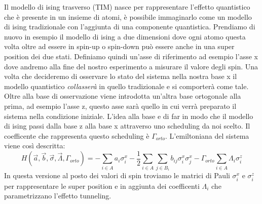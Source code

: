 Il modello di ising trasverso (TIM) nasce per rappresentare l'effetto quantistico che è presente in un insieme di atomi, è possibile immaginarlo come un modello di ising tradizionale con l'aggiunta di una componente quantistica. Prendiamo di nuovo in esempio il modello di ising a due dimensioni dove ogni atomo questa volta oltre ad essere in spin-up o spin-down può essere anche in una super position dei due stati. Definiamo quindi un'asse di riferimento ad esempio l'asse x dove andremo alla fine del nostro esperimento a misurare il valore degli spin. Una volta che decideremo di osservare lo stato del sistema nella nostra base x il modello quantistico \textit{collasserà} in quello tradizionale e si comporterà come tale. Oltre alla base di osservazione viene introdotta un'altra base ortogonale alla prima, ad esempio l'asse z, questo asse sarà quello in cui verrà preparato il sistema nella condizione iniziale. L'idea alla base e di far in modo che il modello di ising passi dalla base z alla base x attraverso uno scheduling da noi scelto. Il coefficente che rappresenta questo scheduling è $\Gamma_{orto}$. L'emiltoniana del sistema viene così descritta:
$$ H(\vec{a}, \vec{b}, \vec{\sigma}, \vec{\Lambda}, \Gamma_{orto}) = - \sum_{i \in A } a_i \sigma^x_i - \frac{1}{2} \sum_{i \in A} \sum_{j \in B_i} b_{ij} \sigma^x_i \sigma^x_j - \Gamma_{orto} \sum_{i \in A } \Lambda_i \sigma^z_i$$
In questa versione al posto dei valori di spin troviamo le matrici di Pauli $\sigma^x_i$ e $\sigma^z_i$ per rappresentare le super position e in aggiunta dei coefficenti $\Lambda_i$ che parametrizzano l'effetto tunneling.

